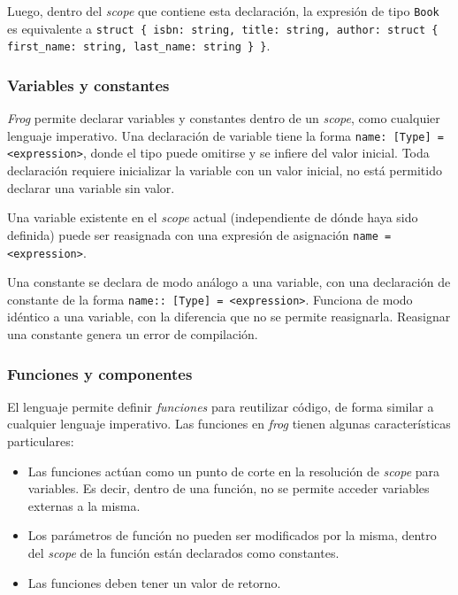 Luego, dentro del \textit{scope} que contiene esta declaración, la expresión de tipo \texttt{Book} es equivalente a \texttt{struct \{ isbn: string, title: string, author: struct \{ first\_name: string, last\_name: string \} \}}.

\subsubsection{Variables y constantes}

\textit{Frog} permite declarar variables y constantes dentro de un \textit{scope}, como cualquier lenguaje imperativo. Una declaración de variable tiene la forma \texttt{name: [Type] = <expression>}, donde el tipo puede omitirse y se infiere del valor inicial. Toda declaración requiere inicializar la variable con un valor inicial, no está permitido declarar una variable sin valor.

Una variable existente en el \textit{scope} actual (independiente de dónde haya sido definida) puede ser reasignada con una expresión de asignación \texttt{name = <expression>}.

Una constante se declara de modo análogo a una variable, con una declaración de constante de la forma \texttt{name:: [Type] = <expression>}. Funciona de modo idéntico a una variable, con la diferencia que no se permite reasignarla. Reasignar una constante genera un error de compilación.

\subsubsection{Funciones y componentes}

El lenguaje permite definir \textit{funciones} para reutilizar código, de forma similar a cualquier lenguaje imperativo. Las funciones en \textit{frog} tienen algunas características particulares:

\begin{itemize}
	\item Las funciones actúan como un punto de corte en la resolución de \textit{scope} para variables. Es decir, dentro de una función, no se permite acceder variables externas a la misma.
	\item Los parámetros de función no pueden ser modificados por la misma, dentro del \textit{scope} de la función están declarados como constantes.
	\item Las funciones deben tener un valor de retorno.
\end{itemize}

